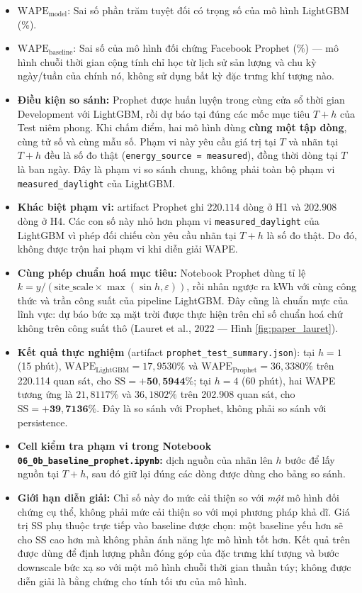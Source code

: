 \documentclass[12pt,a4paper]{article}
\begin{document}
\begin{itemize}
    \item $\text{WAPE}_{\text{model}}$: Sai số phần trăm tuyệt đối có trọng số của mô hình LightGBM~\cite{ke2017} (\%).
    \item $\text{WAPE}_{\text{baseline}}$: Sai số của mô hình đối chứng Facebook Prophet (\%) --- mô hình chuỗi thời gian cộng tính chỉ học từ lịch sử sản lượng và chu kỳ ngày/tuần của chính nó, không sử dụng bất kỳ đặc trưng khí tượng nào.
    \item \textbf{Điều kiện so sánh:} Prophet được huấn luyện trong cùng cửa sổ thời gian Development với LightGBM, rồi dự báo tại đúng các mốc mục tiêu $T+h$ của Test niêm phong. Khi chấm điểm, hai mô hình dùng \textbf{cùng một tập dòng}, cùng tử số và cùng mẫu số. Phạm vi này yêu cầu giá trị tại $T$ và nhãn tại $T+h$ đều là số đo thật (\texttt{energy\_source = measured}), đồng thời dòng tại $T$ là ban ngày. Đây là phạm vi so sánh chung, không phải toàn bộ phạm vi \texttt{measured\_daylight} của LightGBM.
    \item \textbf{Khác biệt phạm vi:} artifact Prophet ghi $220.114$ dòng ở H1 và $202.908$ dòng ở H4. Các con số này nhỏ hơn phạm vi \texttt{measured\_daylight} của LightGBM vì phép đối chiếu còn yêu cầu nhãn tại $T+h$ là số đo thật. Do đó, không được trộn hai phạm vi khi diễn giải WAPE.
    \item \textbf{Cùng phép chuẩn hoá mục tiêu:} Notebook Prophet dùng tỉ lệ $k = y / (\text{site\_scale} \times \max(\sin h, \varepsilon))$, rồi nhân ngược ra kWh với cùng công thức và trần công suất của pipeline LightGBM. Đây cũng là chuẩn mực của lĩnh vực: dự báo bức xạ mặt trời được thực hiện trên chỉ số chuẩn hoá chứ không trên công suất thô (Lauret et al., 2022 --- Hình \ref{fig:paper_lauret}).
    \item \textbf{Kết quả thực nghiệm} (artifact \texttt{prophet\_test\_summary.json}): tại $h=1$ (15 phút), $\text{WAPE}_{\text{LightGBM}} = 17{,}9530\%$ và $\text{WAPE}_{\text{Prophet}} = 36{,}3380\%$ trên 220.114 quan sát, cho $\text{SS} = \mathbf{+50{,}5944\%}$; tại $h=4$ (60 phút), hai WAPE tương ứng là $21{,}8117\%$ và $36{,}1802\%$ trên 202.908 quan sát, cho $\text{SS} = \mathbf{+39{,}7136\%}$. Đây là so sánh với Prophet, không phải so sánh với persistence.
    \item \textbf{Cell kiểm tra phạm vi trong Notebook \texttt{06\_0b\_baseline\_prophet.ipynb}:} dịch nguồn của nhãn lên $h$ bước để lấy nguồn tại $T+h$, sau đó giữ lại đúng các dòng được dùng cho bảng so sánh.
    \item \textbf{Giới hạn diễn giải:} Chỉ số này đo mức cải thiện so với \emph{một} mô hình đối chứng cụ thể, không phải mức cải thiện so với mọi phương pháp khả dĩ. Giá trị SS phụ thuộc trực tiếp vào baseline được chọn: một baseline yếu hơn sẽ cho SS cao hơn mà không phản ánh năng lực mô hình tốt hơn. Kết quả trên được dùng để định lượng phần đóng góp của đặc trưng khí tượng và bước downscale bức xạ so với một mô hình chuỗi thời gian thuần túy; không được diễn giải là bằng chứng cho tính tối ưu của mô hình.
\end{itemize}
\end{document}
